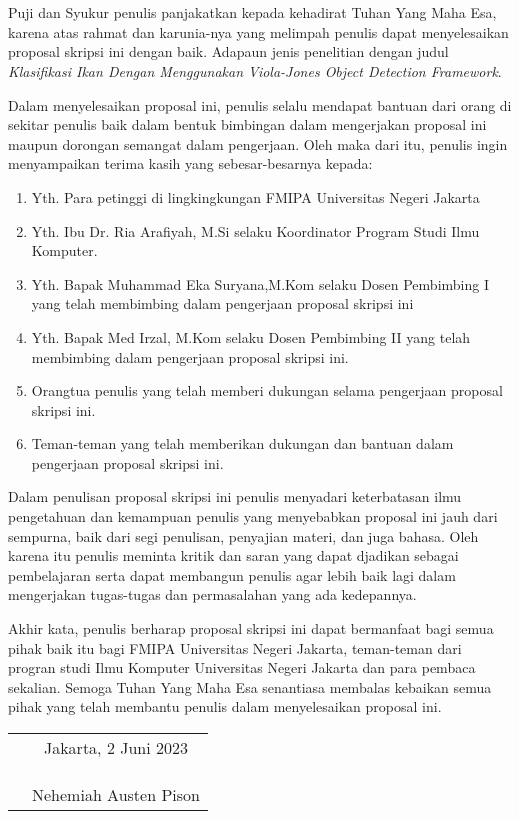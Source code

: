 \chapter*{}

Puji dan Syukur penulis panjakatkan kepada kehadirat Tuhan Yang Maha Esa, 
karena atas rahmat dan karunia-nya yang melimpah penulis dapat menyelesaikan 
proposal skripsi ini dengan baik. Adapaun jenis penelitian dengan judul 
\textit{Klasifikasi Ikan Dengan Menggunakan Viola-Jones Object Detection 
Framework}.

Dalam menyelesaikan proposal ini, penulis selalu mendapat bantuan dari orang 
di sekitar penulis baik dalam bentuk bimbingan dalam mengerjakan proposal 
ini maupun dorongan semangat dalam pengerjaan. Oleh maka dari itu, penulis 
ingin menyampaikan terima kasih yang sebesar-besarnya kepada:

\begin{enumerate}

	\item{Yth. Para petinggi di lingkingkungan FMIPA Universitas Negeri Jakarta}
	\item{Yth. Ibu Dr. Ria Arafiyah, M.Si selaku Koordinator Program Studi Ilmu
		Komputer.}
	\item{Yth. Bapak Muhammad Eka Suryana,M.Kom selaku Dosen Pembimbing I 
		yang telah membimbing dalam pengerjaan proposal skripsi ini}
	\item{Yth. Bapak Med Irzal, M.Kom selaku Dosen Pembimbing II yang telah
		membimbing dalam pengerjaan proposal skripsi ini.}
	\item{Orangtua penulis yang telah memberi dukungan selama pengerjaan 
		proposal skripsi ini.}
	\item{Teman-teman yang telah memberikan dukungan dan bantuan dalam 
		pengerjaan proposal skripsi ini.}
	
\end{enumerate}

Dalam penulisan proposal skripsi ini penulis menyadari keterbatasan ilmu 
pengetahuan dan kemampuan penulis yang menyebabkan proposal ini jauh dari 
sempurna, baik dari segi penulisan, penyajian materi, dan juga bahasa. Oleh 
karena itu penulis meminta kritik dan saran yang dapat djadikan sebagai 
pembelajaran serta dapat membangun penulis agar lebih baik lagi dalam mengerjakan 
tugas-tugas dan permasalahan yang ada kedepannya.

Akhir kata, penulis berharap proposal skripsi ini dapat bermanfaat bagi semua 
pihak baik itu bagi FMIPA Universitas Negeri Jakarta, teman-teman dari progran 
studi Ilmu Komputer Universitas Negeri Jakarta dan para pembaca sekalian. 
Semoga Tuhan Yang Maha Esa senantiasa membalas kebaikan semua pihak yang 
telah membantu penulis dalam menyelesaikan proposal ini.
\vspace{4cm}

\begin{tabular}{p{7.5cm}c}
	&Jakarta, 2 Juni 2023\\
	&\\
	&\\
	&\\
	&Nehemiah Austen Pison
\end{tabular}
